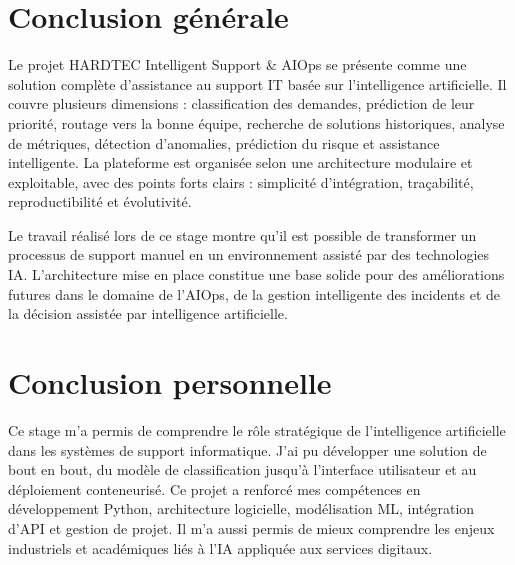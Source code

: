 \documentclass[11pt,a4paper]{report}
\begin{document}
\chapter{Conclusion générale}
Le projet HARDTEC Intelligent Support \& AIOps se présente comme une solution complète d’assistance au support IT basée sur l’intelligence artificielle. Il couvre plusieurs dimensions : classification des demandes, prédiction de leur priorité, routage vers la bonne équipe, recherche de solutions historiques, analyse de métriques, détection d’anomalies, prédiction du risque et assistance intelligente. La plateforme est organisée selon une architecture modulaire et exploitable, avec des points forts clairs : simplicité d’intégration, traçabilité, reproductibilité et évolutivité.

Le travail réalisé lors de ce stage montre qu’il est possible de transformer un processus de support manuel en un environnement assisté par des technologies IA. L’architecture mise en place constitue une base solide pour des améliorations futures dans le domaine de l’AIOps, de la gestion intelligente des incidents et de la décision assistée par intelligence artificielle.

\chapter*{Conclusion personnelle}
Ce stage m’a permis de comprendre le rôle stratégique de l’intelligence artificielle dans les systèmes de support informatique. J’ai pu développer une solution de bout en bout, du modèle de classification jusqu’à l’interface utilisateur et au déploiement conteneurisé. Ce projet a renforcé mes compétences en développement Python, architecture logicielle, modélisation ML, intégration d’API et gestion de projet. Il m’a aussi permis de mieux comprendre les enjeux industriels et académiques liés à l’IA appliquée aux services digitaux.
\end{document}
